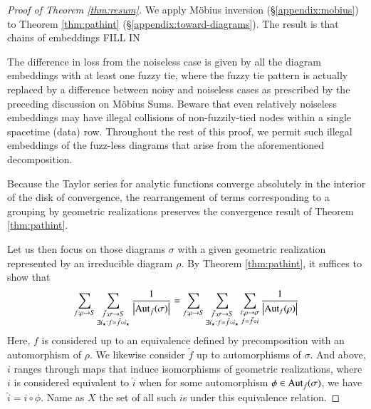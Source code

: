 \documentclass[openany, notitlepage, justified]{tufte-book}
\theoremstyle{plain}
\theoremstyle{definition}
\newcommand{\wabs}[1]{\left|#1\right|}
\newcommand{\Aut}{\text{\textnormal{Aut}}}
\begin{document}
        \begin{proof}[Proof of Theorem \ref{thm:resum}]
            We apply M\"obius inversion (\S\ref{appendix:mobius}) to Theorem
            \ref{thm:pathint} (\S\ref{appendix:toward-diagrams}).  The result
            is that chains of embeddings  
            {\color{red} FILL IN}

            The difference in loss from the noiseless case is given by all the
            diagram embeddings with at least one fuzzy tie, where the fuzzy tie
            pattern is actually replaced by a difference between noisy and
            noiseless cases as prescribed by the preceding discussion on
            M\"obius Sums.  Beware that even relatively noiseless embeddings
            may have illegal collisions of non-fuzzily-tied nodes within a
            single spacetime (data) row.  Throughout the rest of this proof, we
            permit such illegal embeddings of the fuzz-less diagrams that arise
            from the aforementioned decomposition.  

            Because the Taylor series for analytic functions converge
            absolutely in the interior of the disk of convergence, the
            rearrangement of terms corresponding to a grouping by geometric
            realizations preserves the convergence result of Theorem
            \ref{thm:pathint}.  

            Let us then focus on those diagrams $\sigma$ with a given geometric
            realization represented by an irreducible diagram $\rho$.  By
            Theorem \ref{thm:pathint}, it suffices to show that
            \begin{equation} \label{eq:hard}
                \sum_{f:\rho\to S}
                \sum_{\substack{
                    \tilde f:\sigma\to S \\
                    \exists i_\star: f=\tilde f \circ i_\star
                }}
                \frac{1}{\wabs{\Aut_{\tilde f}(\sigma)}}
                =
                \sum_{f:\rho\to S}
                \sum_{\substack{
                    \tilde f:\sigma\to S \\
                    \exists i_\star: f=\tilde f \circ i_\star
                }}
                \sum_{\substack{
                    i:\rho\to\sigma \\
                    f = \tilde f \circ i
                }}
                \frac{1}{\wabs{\Aut_{f}(\rho)}}
            \end{equation}
            Here, $f$ is considered up to an equivalence defined by
            precomposition with an automorphism of $\rho$.  We likewise
            consider $\tilde f$ up to automorphisms of $\sigma$.  And above,
            $i$ ranges through maps that induce isomorphisms of geometric
            realizations, where $i$ is considered equivalent to $\hat i$ when
            for some automorphism $\phi \in \Aut_{\tilde f}(\sigma)$, we have
            $\hat i = i \circ \phi$.  Name as $X$ the set of all such $i$s
            under this equivalence relation.


\end{proof}
\end{document}
